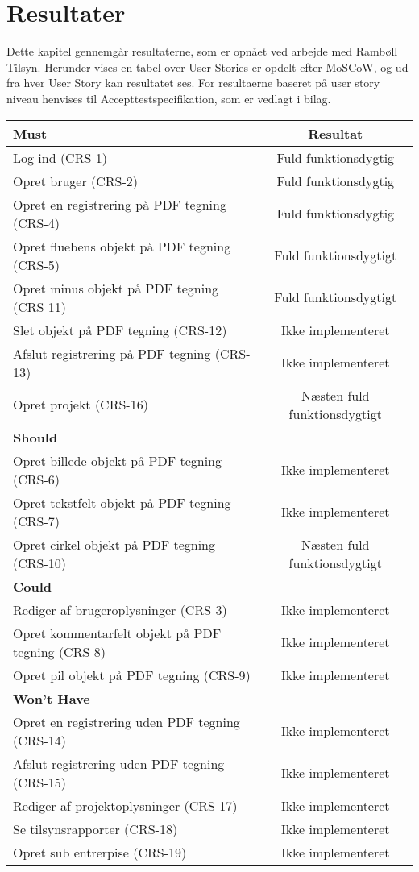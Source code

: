 \chapter{Resultater}
Dette kapitel gennemgår resultaterne, som er opnået ved arbejde med Rambøll Tilsyn. Herunder vises en tabel over User Stories er opdelt efter MoSCoW, og ud fra hver User Story kan resultatet ses.
For resultaerne baseret på user story niveau henvises til Accepttestspecifikation, som er vedlagt i bilag. \\
\begin{tabular}{ l | c  }
	\hline
	\textbf{Must} & \textbf{Resultat} \\ \hline
	Log ind (CRS-1) & Fuld funktionsdygtig \\
	\hline
	Opret bruger (CRS-2) & Fuld funktionsdygtig \\
	\hline
	Opret en registrering på PDF tegning (CRS-4) & Fuld funktionsdygtig\\
	\hline
	Opret fluebens objekt på PDF tegning (CRS-5) & Fuld funktionsdygtigt\\
	\hline
	Opret minus objekt på PDF tegning (CRS-11) & Fuld funktionsdygtigt\\
	\hline
	Slet objekt på PDF tegning (CRS-12) & Ikke implementeret\\
	\hline
	Afslut registrering på PDF tegning (CRS-13) & Ikke implementeret\\
	\hline
	Opret projekt (CRS-16) & Næsten fuld funktionsdygtigt\\
	\hline
	\hline
	\textbf{Should} &  \\ \hline
	Opret billede objekt på PDF tegning (CRS-6) & Ikke implementeret\\
	\hline
	Opret tekstfelt objekt på PDF tegning (CRS-7) & Ikke implementeret\\
	\hline
	Opret cirkel objekt på PDF tegning (CRS-10) & Næsten fuld funktionsdygtigt\\
	\hline
	\hline
	\textbf{Could} &  \\ \hline
	Rediger af brugeroplysninger (CRS-3) & Ikke implementeret\\
	\hline
	Opret kommentarfelt objekt på PDF tegning (CRS-8)  & Ikke implementeret\\
	\hline
	Opret pil objekt på PDF tegning (CRS-9) & Ikke implementeret\\
	\hline
	\hline
	\textbf{Won't Have} & \\ \hline
	Opret en registrering uden PDF tegning (CRS-14) & Ikke implementeret\\
	\hline
	Afslut registrering uden PDF tegning (CRS-15) & Ikke implementeret\\
	\hline
	Rediger af projektoplysninger (CRS-17) & Ikke implementeret\\
	\hline
	Se tilsynsrapporter (CRS-18) & Ikke implementeret\\
	\hline
	Opret sub entrerpise (CRS-19) & Ikke implementeret\\
	\hline
\end{tabular} \\


